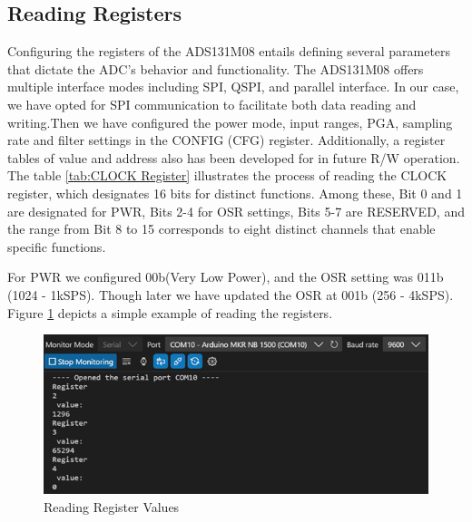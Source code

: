 \subsection{Reading Registers} 
Configuring the registers of the ADS131M08 entails defining several parameters that dictate the ADC's behavior and functionality. The ADS131M08 offers multiple interface modes including SPI, QSPI, and parallel interface. In our case, we have opted for SPI communication to facilitate both data reading and writing.Then we have configured the power mode, input ranges, PGA, sampling rate and filter settings in the CONFIG (CFG) register. Additionally, a register tables of value and address also has been developed for in future R/W operation. The table \ref{tab:CLOCK Register} illustrates the process of reading the CLOCK register, which designates 16 bits for distinct functions. Among these, Bit 0 and 1 are designated for PWR, Bits 2-4 for OSR settings, Bits 5-7 are RESERVED, and the range from Bit 8 to 15 corresponds to eight distinct channels that enable specific functions. 
\begin{table}[htbp]
  \centering
  \caption{CLOCK Register Setting}
  \label{tab:CLOCK Register}
\end{table}
For PWR we configured 00b(Very Low Power), and the OSR setting was 011b (1024 - 1kSPS). Though later we have updated the OSR at 001b (256 - 4kSPS). Figure \ref{fig:x Reading Register} depicts a simple example of reading the registers.
\begin{figure}[htbp]
\centering
\includegraphics[scale=0.7]{images/Read_register.png}
\caption{Reading Register Values}
\label{fig:x Reading Register}
\end{figure}
